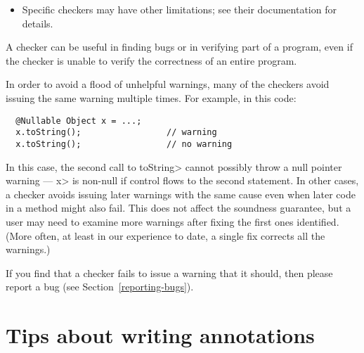 \begin{itemize}

\item
  Specific checkers may have other limitations; see their documentation for
  details.

\end{itemize}

A checker can be useful in finding bugs or in verifying part of a
program, even if the checker is unable to verify the correctness of an
entire program.

In order to avoid a flood of unhelpful warnings, many of the checkers avoid
issuing the same warning multiple times.  For example, in this code:

\begin{Verbatim}
  @Nullable Object x = ...;
  x.toString();                 // warning
  x.toString();                 // no warning
\end{Verbatim}

\noindent
In this case, the second call to \<toString> cannot possibly throw a null
pointer warning --- \<x> is non-null if control flows to the second
statement.
In other cases, a checker avoids issuing later warnings with the same cause
even when later code in a method might also fail.
This does not
affect the soundness guarantee, but a user may need to examine more
warnings after fixing the first ones identified.  (More often, at least in
our experience to date, a single fix corrects all the warnings.)


If you find that a checker fails to issue a warning that it
should, then please report a bug (see Section~\ref{reporting-bugs}).


\section{Tips about writing annotations\label{tips-about-writing-annotations}}

